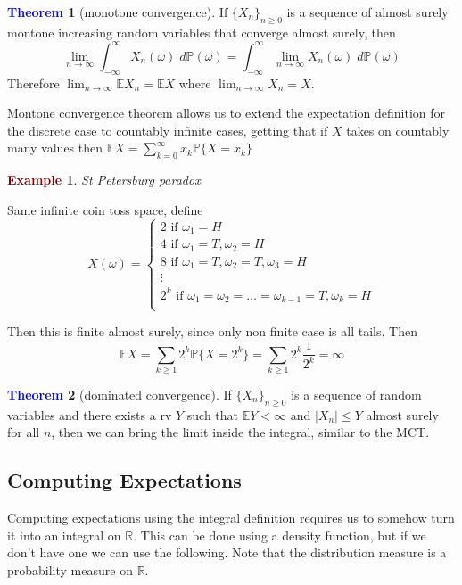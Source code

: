 \documentclass[11pt]{article}
\theoremstyle{definition}
\theoremstyle{definition}
\newcommand{\R}[0]{\mathbb{R}}
\newtheorem{theorem}{\textcolor{blue}{Theorem}}
\theoremstyle{definition}
\newtheorem{ex}{\textcolor{Maroon}{Example}}
\theoremstyle{remark}
\begin{document}
\begin{theorem}[monotone convergence]
    If $\{X_n\}_{n \geq 0}$ is a sequence of almost surely montone increasing random variables that converge almost surely, then
    \[
        \lim_{n \to \infty} \int_{-\infty}^\infty X_n(\omega) \; d\mathbb{P}(\omega) = 
        \int_{-\infty}^\infty \lim_{n \to \infty}  X_n(\omega) \; d\mathbb{P}(\omega)
    \]  
    Therefore $\lim_{n \to \infty} \mathbb{E} X_n = \mathbb{E} X $ where $\lim_{n \to \infty} X_n = X$.  
\end{theorem}

Montone convergence theorem allows us to extend the expectation definition for the discrete case to countably infinite
cases, getting that if $X$ takes on countably many values then $\mathbb{E} X = \sum_{k = 0}^\infty x_k \mathbb{P}\{X = x_k\}$  

\begin{ex}\textit{St Petersburg paradox}

    Same infinite coin toss space, define
    \[
        X(\omega) = \begin{cases}
            2 \text{ if } \omega_1 = H \\
            4 \text{ if } \omega_1 = T, \omega_2 = H \\
            8 \text{ if } \omega_1 = T, \omega_2 = T, \omega_3 = H \\
            \vdots \\
            2^k \text{ if } \omega_1 = \omega_2 = \dots = \omega_{k - 1} = T, \omega_k = H \\
        \end{cases}
    \] 
    
    Then this is finite almost surely, since only non finite case is all tails. Then
    \[
        \mathbb{E} X = \sum_{k \geq 1} 2^k \mathbb{P}\{X = 2^k\} = \sum_{k \geq 1} 2^k \frac{1}{2^k} = \infty
    \] 
\end{ex}

\begin{theorem}[dominated convergence]
    If $\{X_n\}_{n \geq 0}$ is a sequence of random variables and there exists a rv $Y$ such that $\mathbb{E} Y < \infty$
    and $|X_n| \leq Y$ almost surely for all $n$, then we can bring the limit inside the integral, similar to the MCT.   
\end{theorem}

\subsection{Computing Expectations}
Computing expectations using the integral definition requires us to somehow turn it into an integral on $\R$.
This can be done using a density function, but if we don't have one we can use the following. Note that the distribution
measure is a probability measure on $\R$. 
\end{document}
